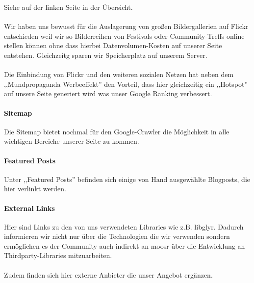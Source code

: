 Siehe auf der linken Seite in der Übersicht.
\\
\\
Wir haben uns bewusst für die Auslagerung von großen Bildergallerien auf Flickr
entschieden weil wir so Bilderreihen von Festivals oder Community-Treffs online
stellen können ohne dass hierbei Datenvolumen-Kosten auf unserer Seite
entstehen. Gleichzeitg sparen wir Speicherplatz auf unserem Server.
\\
\\
Die Einbindung von Flickr und den weiteren sozialen Netzen hat neben dem
,,Mundpropaganda Werbeeffekt'' den Vorteil, dass hier gleichzeitig ein
,,Hotspot'' auf unsere Seite generiert wird was unser Google Ranking verbessert.

\paragraph{Sitemap}
Die Sitemap bietet nochmal für den Google-Crawler die Möglichkeit in
alle wichtigen Bereiche unserer Seite zu kommen.
\paragraph{Featured Posts}
Unter ,,Featured Posts'' befinden sich einige von Hand ausgewählte Blogposts,
die hier verlinkt werden.

\paragraph{External Links}
Hier sind Links zu den von uns verwendeten Libraries wie z.B. libglyr. Dadurch
informieren wir nicht nur über die Technologien die wir verwenden sondern
ermöglichen es der Community auch indirekt an moosr über die Entwicklung an
Thirdparty-Libraries mitzuarbeiten.
\\
\\
Zudem finden sich hier externe Anbieter die unser Angebot ergänzen.
